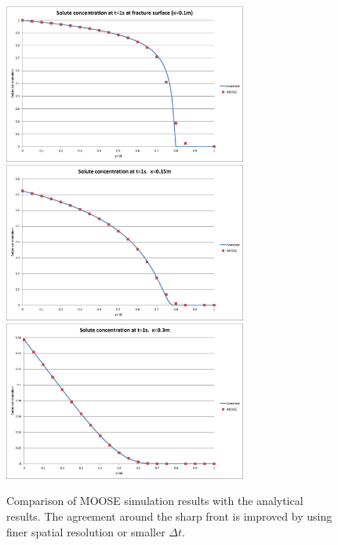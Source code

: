 \documentclass[]{scrreprt}
\begin{document}
\begin{figure}[p]
\centering
\includegraphics[width=8cm]{single_0.1.eps} \\
\includegraphics[width=8cm]{single_0.15.eps} \\
\includegraphics[width=8cm]{single_0.3.eps}
\caption{Comparison of MOOSE simulation results with the analytical
  results.  The agreement around the sharp front is improved by using
  finer spatial resolution or smaller $\Delta t$.}
\label{single_results.fig}
\end{figure}
\end{document}
